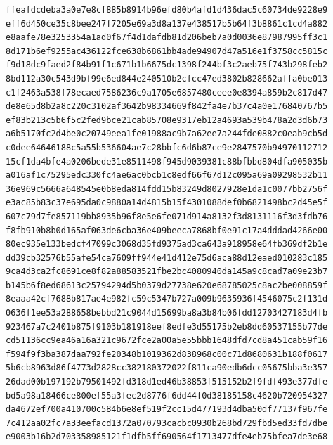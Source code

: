 \begin{verbatim}
ffeafdcdeba3a0e7e8cf885b8914b96efd80b4afd1d436dac5c60734de9228e9
eff6d450ce35c8bee247f7205e69a3d8a137e438517b5b64f3b8861c1cd4a882
e8aafe78e3253354a1ad0f67f4d1dafdb81d206beb7a0d0036e87987995ff3c1
8d171b6ef9255ac436122fce638b6861bb4ade94907d47a516e1f3758cc5815c
f9d18dc9faed2f84b91f1c671b1b6675dc1398f244bf3c2aeb75f743b298feb2
8bd112a30c543d9bf99e6ed844e240510b2cfcc47ed3802b828662affa0be013
c1f2463a538f78ecaed7586236c9a1705e6857480ceee0e8394a859b2c817d47
de8e65d8b2a8c220c3102af3642b98334669f842fa4e7b37c4a0e176840767b5
ef83b213c5b6f5c2fed9bce21cab85708e9317eb12a4693a539b478a2d3d6b73
a6b5170fc2d4be0c20749eea1fe01988ac9b7a62ee7a244fde0882c0eab9cb5d
c0dee64646188c5a55b536604ae7c28bbfc6d6b87ce9e2847570b94970112712
15cf1da4bfe4a0206bede31e8511498f945d9039381c88bfbbd804dfa905035b
a016af1c75295edc330fc4ae6ac0bcb1c8edf66f67d12c095a69a09298532b11
36e969c5666a648545e0b8eda814fdd15b83249d8027928e1da1c0077bb2756f
e3ac85b83c37e695da0c9880a14d4815b15f4301088def0b6821498bc2d45e5f
607c79d7fe857119bb8935b96f8e5e6fe071d914a8132f3d8131116f3d3fdb76
f8fb910b8b0d165af063de6cba36e409beeca7868bf0e91c17a4dddad4266e00
80ec935e133bedcf47099c3068d35fd9375ad3ca643a918958e64fb369df2b1e
dd39cb32576b55afe54ca7609ff944e41d412e75d6aca88d12eaed010283c185
9ca4d3ca2fc8691ce8f82a88583521fbe2bc4080940da145a9c8cad7a09e23b7
b145b6f8ed68613c25794294d5b0379d27738e620e68785025c8ac2be008859f
8eaaa42cf7688b817ae4e982fc59c5347b727a009b9635936f4546075c2f131d
0636f1ee53a288658bebbd21c9044d15699ba8a3b84b06fdd12703427183d4fb
923467a7c2401b875f9103b181918eef8edfe3d55175b2eb8dd60537155b77de
cd51136cc9ea46a16a321c9672fce2a00a5e55bbb1648dfd7cd8a451cab59f16
f594f9f3ba387daa792fe20348b1019362d838968c00c71d8680631b188f0617
5b6cb8963d86f4773d2828cc382180372022f811ca90edb6dcc05675bba3e357
26dad00b197192b79501492fd318d1ed46b38853f515152b2f9fdf493e377dfe
bd5a98a18466ce800ef55a3fec2d8776f6dd44f0d38185158c4620b720954327
da4672ef700a410700c584b6e8ef519f2cc15d477193d4dba50df77137f967fe
7c412aa02fc7a33eefacd1372a070793cacbc0930b268bd729fbd5ed33fd7dbe
e9003b16b2d703358985121f1dfb5ff690564f1713477dfe4eb75bfea7de3e68
\end{verbatim}
